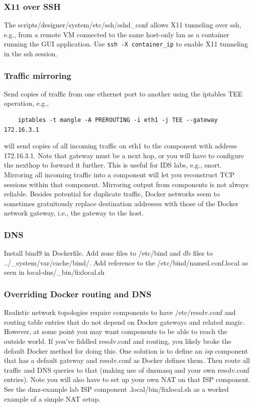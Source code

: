 \documentclass[12pt]{article}
\begin{document}
\subsubsection{X11 over SSH}
The scripts/designer/system/etc/ssh/sshd\_conf allows X11 tunneling over ssh, e.g.,
from a remote VM connected to the same host-only lan as a container running the GUI
application.  Use {\tt ssh -X container\_ip} to enable X11 tunneling in the ssh session.

\subsubsection{Traffic mirroring}
Send copies of traffic from one ethernet port to another using the iptables TEE operation, e.g.,
\begin{verbatim}
    iptables -t mangle -A PREROUTING -i eth1 -j TEE --gateway 172.16.3.1
\end{verbatim}
\noindent will send copies of all incoming traffic on eth1 to the component with address 172.16.3.1.
Note that gateway must be a next hop, or you will have to configure the nexthop to forward it further.
This is useful for IDS labs, e.g., snort.  Mirroring all incoming traffic into a component will let you
reconstruct TCP sessions within that component.  Mirroring output from components is not always reliable.
Besides potential for duplicate traffic, Docker networks seem to sometimes gratuitously replace destination
addresses with those of the Docker network gateway, i.e., the gateway to the host.

\subsubsection{DNS}
Install bind9 in Dockerfile.  Add zone files to /etc/bind and db files to ../\_system/var/cache/bind/.
Add reference to the /etc/bind/named.conf.local as seen in local-dns/\_bin/fixlocal.sh

\subsubsection{Overriding Docker routing and DNS}
Realistic network topologies require components to have /etc/resolv.conf and routing
table entries that do not depend on Docker gateways and related magic.  However, at some point you may
want components to be able to reach the outside world.  If you've fiddled resolv.conf and routing,
you likely broke the default Docker method for doing this.  One solution is to 
define an \textit{isp} component that has a default gateway and resolv.conf as Docker defines them.  Then
route all traffic and DNS queries to that (making use of dnsmasq and your own resolv.conf entries).  
Note you will also have to set up your own NAT on that ISP component.  See the dmz-example lab
ISP component .local/bin/fixlocal.sh as a worked example of a simple NAT setup.
\end{document}
